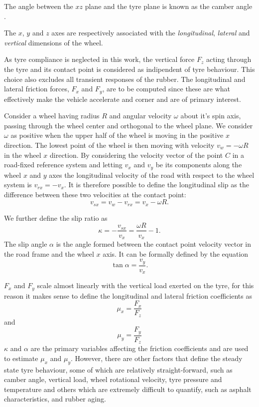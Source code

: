 The angle between the $xz$ plane and the tyre plane is known as the camber angle .

The $x$, $y$ and $z$ axes are respectively associated with the \textit{longitudinal}, \textit{lateral} and \textit{vertical} dimensions of the wheel.

As tyre compliance is neglected in this work, the vertical force $F_z$ acting through the tyre and its contact point is considered as indipendent of tyre behaviour. This choice also excludes all transient responses of the rubber. The longitudinal and lateral friction forces, $F_x$ and $F_y$, are to be computed since these are what effectively make the vehicle accelerate and corner and are of primary interest.

Consider a wheel  having radius $R$ and angular velocity $\omega$ about it's spin axis, passing through the wheel center and orthogonal to the wheel plane.
We consider $\omega$ as positive when the upper half of the wheel is moving in the positive $x$ direction. The lowest point of the wheel is then moving with velocity $v_{w} = -\omega R$ in the wheel $x$ direction.
By considering the velocity vector of the point $C$ in a road-fixed reference system and letting $v_x$ and $v_y$ be its components along the wheel $x$ and $y$ axes the longitudinal velocity of the road with respect to the wheel system is $v_{rx} = - v_x$.
It is therefore possible to define the longitudinal slip as the difference between these two velocities at the contact point:
$$v_{sx} = v_{w} - v_{rx} = v_x - \omega R .$$

We further define the slip ratio as 
$$ \kappa = - \frac{v_{sx}}{v_{x}} = \frac{\omega R}{v_x}-1.$$
The slip angle $\alpha$ is the angle formed between the contact point velocity vector in the road frame and the wheel $x$ axis. It can be formally defined by the equation
$$\tan{\alpha} = \frac{v_y}{v_x}.$$

$F_x$ and $F_y$ scale almost linearly with the vertical load exerted on the tyre, for this reason it makes sense to define the longitudinal and lateral friction coefficients as
$$ \mu_x = \frac{F_x}{F_z}$$
and
$$ \mu_y = \frac{F_y}{F_z}$$
$\kappa$ and $\alpha$ are the primary variables affecting the friction coefficients and are used to estimate $\mu_x$ and $\mu_y$. However, there are other factors that define the steady state tyre behaviour, some of which are relatively straight-forward, such as camber angle, vertical load, wheel rotational velocity, tyre pressure and temperature and others which are extremely difficult to quantify, such as asphalt characteristics, and rubber aging.

